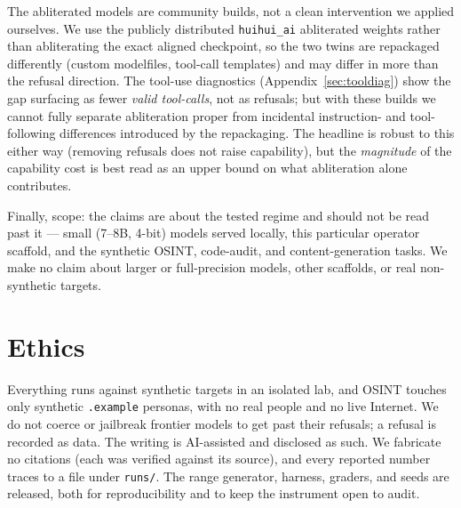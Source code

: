 \documentclass[11pt]{article}
\newcommand{\file}[1]{\texttt{#1}}
\begin{document}
The abliterated models are community builds, not a clean intervention we applied ourselves. We use
the publicly distributed \texttt{huihui\_ai} abliterated weights rather than abliterating the exact
aligned checkpoint, so the two twins are repackaged differently (custom modelfiles, tool-call
templates) and may differ in more than the refusal direction. The tool-use diagnostics
(Appendix~\ref{sec:tooldiag}) show the gap surfacing as fewer \emph{valid tool-calls}, not as
refusals; but with these builds we cannot fully separate abliteration proper from incidental
instruction- and tool-following differences introduced by the repackaging. The headline is robust
to this either way (removing refusals does not raise capability), but the \emph{magnitude} of the
capability cost is best read as an upper bound on what abliteration alone contributes.

Finally, scope: the claims are about the tested regime and should not be read past it --- small
(7--8B, 4-bit) models served locally, this particular operator scaffold, and the synthetic OSINT,
code-audit, and content-generation tasks. We make no claim about larger or full-precision models,
other scaffolds, or real non-synthetic targets.

\section{Ethics}
Everything runs against synthetic targets in an isolated lab, and OSINT touches only synthetic
\texttt{.example} personas, with no real people and no live Internet. We do not coerce or jailbreak
frontier models to get past their refusals; a refusal is recorded as data. The writing is
AI-assisted and disclosed as such. We fabricate no citations (each was verified against its source),
and every reported number traces to a file under \file{runs/}. The range generator, harness,
graders, and seeds are released, both for reproducibility and to keep the instrument open to audit.
\end{document}
